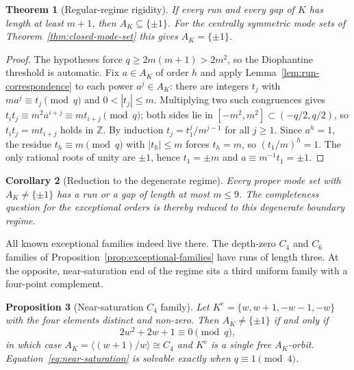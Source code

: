 \documentclass[11pt,a4paper]{article}
\newtheorem{theorem}{Theorem}[section]
\newtheorem{proposition}[theorem]{Proposition}
\newtheorem{corollary}[theorem]{Corollary}
\theoremstyle{definition}
\theoremstyle{remark}
\begin{document}
\begin{theorem}[Regular-regime rigidity]
  \label{thm:rigidity}
  If every run and every gap of $K$ has length at least $m+1$, then
  $A_K\subseteq\{\pm1\}$.
  For the centrally symmetric mode sets of Theorem~\ref{thm:closed-mode-set} this gives
  $A_K=\{\pm1\}$.
\end{theorem}

\begin{proof}
  The hypotheses force $q\geq2m(m+1)>2m^2$, so the Diophantine threshold is automatic.
  Fix $a\in A_K$ of order $h$ and apply Lemma~\ref{lem:run-correspondence} to each power
  $a^j\in A_K$: there are integers $t_j$ with $ma^j\equiv t_j\pmod q$ and
  $0<|t_j|\leq m$.
  Multiplying two such congruences gives
  $t_it_j\equiv m^2a^{i+j}\equiv mt_{i+j}\pmod q$; both sides lie in
  $[-m^2,m^2]\subset(-q/2,q/2)$, so $t_it_j=mt_{i+j}$ holds in $\mathbb{Z}$.
  By induction $t_j=t_1^j/m^{j-1}$ for all $j\geq1$.
  Since $a^h=1$, the residue $t_h\equiv m\pmod q$ with $|t_h|\leq m$ forces $t_h=m$, so
  $(t_1/m)^h=1$.
  The only rational roots of unity are $\pm1$, hence $t_1=\pm m$ and
  $a\equiv m^{-1}t_1=\pm1$.
\end{proof}

\begin{corollary}[Reduction to the degenerate regime]
  \label{cor:degenerate-reduction}
  Every proper mode set with $A_K\ne\{\pm1\}$ has a run or a gap of length at most
  $m\leq9$.
  The completeness question for the exceptional orders is thereby reduced to this degenerate
  boundary regime.
\end{corollary}

All known exceptional families indeed live there.
The depth-zero $C_4$ and $C_6$ families of Proposition~\ref{prop:exceptional-families} have
runs of length three.
At the opposite, near-saturation end of the regime sits a third uniform family with a
four-point complement.

\begin{proposition}[Near-saturation $C_4$ family]
  \label{prop:near-saturation}
  Let $K^{\mathrm{c}}=\{w,w+1,-w-1,-w\}$ with the four elements distinct and non-zero.
  Then $A_K\ne\{\pm1\}$ if and only if
  \begin{equation}
    2w^2+2w+1\equiv0\pmod q,
    \label{eq:near-saturation}
  \end{equation}
  in which case $A_K=\langle(w+1)/w\rangle\cong C_4$ and $K^{\mathrm{c}}$ is a single free
  $A_K$-orbit.
  Equation~\eqref{eq:near-saturation} is solvable exactly when $q\equiv1\pmod4$.
\end{proposition}
\end{document}
